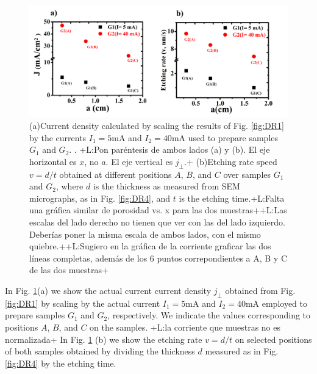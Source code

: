 \documentclass{article}
\newcommand{\notaL}[1]{{\color{blue}+L:#1+}}
\begin{document}
\begin{figure}
  \centering
   \includegraphics[width=\textwidth]{Images/grinJDR}
  \caption{(a)Current density calculated by scaling the results of
    Fig. \ref{fig:DR1} by the currents $I_1=5\text{mA}$ and
    $I_2=40\text{mA}$ used to prepare samples $G_1$ and $G_2$.
. \notaL{Pon paréntesis de ambos
      lados (a) y (b). El eje horizontal es $x$, no $a$. El eje
      vertical es $j_\perp$.}
    (b)Etching rate speed $v=d/t$ obtained at different positions $A$, $B$,
    and $C$ over samples $G_1$ and $G_2$, where $d$ is the thickness
    as measured from SEM micrographs, as in Fig. \ref{fig:DR4},
    and $t$ is the etching time.\notaL{Falta una gráfica similar de
      porosidad vs. x para las dos muestras}\notaL{Las escalas del
      lado derecho no tienen que ver con las del lado
      izquierdo. Deberías poner la misma escala de ambos lados, con el
    mismo quiebre.}\notaL{Sugiero en la gráfica de la corriente
    graficar las dos líneas completas, además de los 6 puntos
    correpondientes a A, B y C de las dos muestras}}
  \label{fig:JDR}
\end{figure}
In Fig. \ref{fig:JDR}(a) we show the actual current current density
$j_\perp$ obtained from Fig. \ref{fig:DR1} by scaling by the actual
current $I_1=5\text{mA}$ and $I_2=40\text{mA}$ employed to prepare
samples $G_1$ and $G_2$, respectively. We indicate the values
corresponding to positions $A$, $B$, and $C$ on the samples.
\notaL{la
  corriente que muestras no es normalizada}
In Fig. \ref{fig:JDR} (b) we show the etching rate $v = d/t$ on
selected positions of both samples obtained by dividing the thickness
$d$ measured as in Fig. \ref{fig:DR4} by the etching time.
\end{document}
